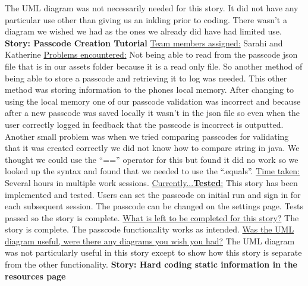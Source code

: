\documentclass[letterpaper,12pt,titlepage]{article}
\begin{document}
The UML diagram was not necessarily needed for this story. It did not have any particular use other than giving us an inkling prior to coding. There wasn’t a diagram we wished we had as the ones we already did have had limited use.
\newline
\newline
\newpage
\noindent
\textbf{Story: Passcode Creation Tutorial}
\newline
\newline
\underline{Team members assigned:}
Sarahi and Katherine
\newline
\underline{Problems encountered:}
Not being able to read from the passcode json file that is in our assets folder because it is a read only file. So another method of being able to store a passcode and retrieving it to log was needed. This other method was storing information to the phones local memory. After changing to using the local memory one of our passcode validation was incorrect and because after a new passcode was saved locally it wasn’t in the json file so even when the user correctly logged in feedback that the passcode is incorrect is outputted. 
Another small problem was when we tried comparing passcodes for validating that it was created correctly we did not know how to compare string in java. We thought we could use the “==” operator for this but found it did no work so we looked up the syntax and found that we needed to use the “.equals”.
\newline
\underline{Time taken:}
Several hours in multiple work sessions. 
\newline
\underline{Currently...\textbf{Tested}:}
This story has been implemented and tested. Users can set the passcode on initial run and sign in for each subsequent session. The passcode can be changed on the settings page. Tests passed so the story is complete. 
\newline
\underline{What is left to be completed for this story?}
The story is complete. The passcode functionality works as intended.
\newline
\underline{Was the UML diagram useful, were there any diagrams you wish you had?}
The UML diagram was not particularly useful in this story except to show how this story is separate from the other functionality.
\newline
\newline
\newpage
\noindent
\textbf{Story: Hard coding static information in the resources page}
\newline
\newline
\end{document}
